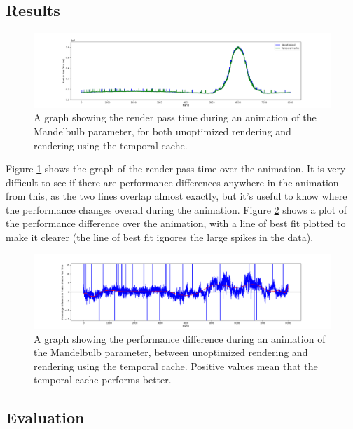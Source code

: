 \subsection{Results}

\begin{figure}[ht]
	\centering
	\includegraphics[width=\linewidth, frame]{Images/Results/Mandelbulb-Parameter-Animation.png}
	\caption{A graph showing the render pass time during an animation of the Mandelbulb parameter, for both unoptimized rendering and rendering using the temporal cache.}
	\label{figure:mandelbulb-parameter-animation}
\end{figure}

Figure \ref{figure:mandelbulb-parameter-animation} shows the graph of the render pass time over the animation. It is very difficult to see if there are performance differences anywhere in the animation from this, as the two lines overlap almost exactly, but it's useful to know where the performance changes overall during the animation. Figure \ref{figure:mandelbulb-parameter-animation-gain} shows a plot of the performance difference over the animation, with a line of best fit plotted to make it clearer (the line of best fit ignores the large spikes in the data).

\begin{figure}[ht]
	\centering
	\includegraphics[width=\linewidth, frame]{Images/Results/Mandelbulb-Parameter-Animation-Gain.png}
	\caption{A graph showing the performance difference during an animation of the Mandelbulb parameter, between unoptimized rendering and rendering using the temporal cache. Positive values mean that the temporal cache performs better.}
	\label{figure:mandelbulb-parameter-animation-gain}
\end{figure}

\subsection{Evaluation}

